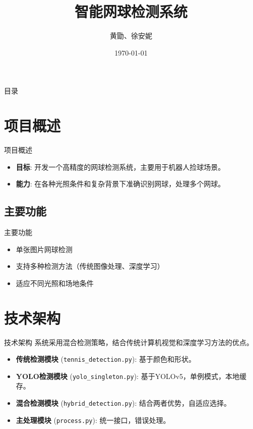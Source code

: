 \documentclass{beamer}
\title{智能网球检测系统}
\author{黄勖、徐安妮}
\date{\today}
\begin{document}
\begin{frame}
    \titlepage
\end{frame}

\begin{frame}{目录}
    \tableofcontents
\end{frame}

\section{项目概述}
\begin{frame}{项目概述}
    \begin{itemize}
        \item \textbf{目标}: 开发一个高精度的网球检测系统，主要用于机器人捡球场景。
        \item \textbf{能力}: 在各种光照条件和复杂背景下准确识别网球，处理多个网球。
    \end{itemize}
\end{frame}

\subsection{主要功能}
\begin{frame}{主要功能}
    \begin{itemize}
        \item 单张图片网球检测
        \item 支持多种检测方法（传统图像处理、深度学习）
        \item 适应不同光照和场地条件
    \end{itemize}
\end{frame}

\section{技术架构}
\begin{frame}{技术架构}
    系统采用混合检测策略，结合传统计算机视觉和深度学习方法的优点。
    \begin{itemize}
        \item \textbf{传统检测模块} (\texttt{tennis\_detection.py}): 基于颜色和形状。
        \item \textbf{YOLO检测模块} (\texttt{yolo\_singleton.py}): 基于YOLOv5，单例模式，本地缓存。
        \item \textbf{混合检测模块} (\texttt{hybrid\_detection.py}): 结合两者优势，自适应选择。
        \item \textbf{主处理模块} (\texttt{process.py}): 统一接口，错误处理。
    \end{itemize}
\end{frame}
\end{document}
